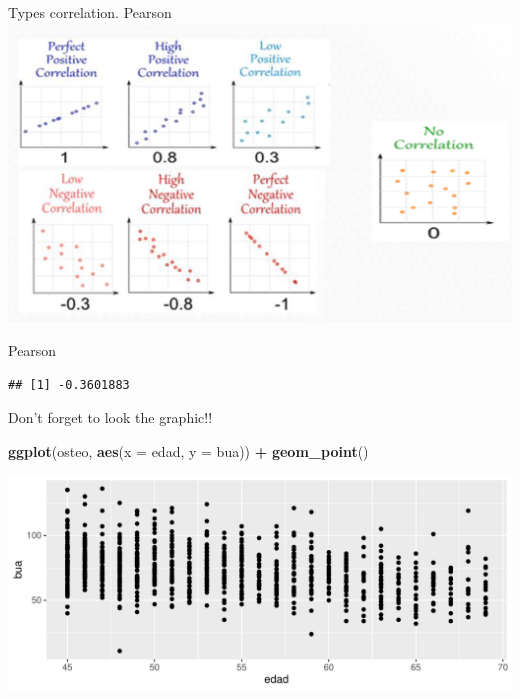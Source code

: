\documentclass[
  ignorenonframetext,
]{beamer}
\newenvironment{Shaded}{\begin{snugshade}}{\end{snugshade}}
\newcommand{\AttributeTok}[1]{\textcolor[rgb]{0.13,0.29,0.53}{#1}}
\newcommand{\FunctionTok}[1]{\textcolor[rgb]{0.13,0.29,0.53}{\textbf{#1}}}
\newcommand{\NormalTok}[1]{#1}
\newcommand{\SpecialCharTok}[1]{\textcolor[rgb]{0.81,0.36,0.00}{\textbf{#1}}}
\newcommand{\StringTok}[1]{\textcolor[rgb]{0.31,0.60,0.02}{#1}}
\begin{document}
\begin{frame}{Types correlation. Pearson}
\label{types-correlation.-pearson}
\includegraphics{images/types_correlation.png}
\end{frame}

\begin{frame}[fragile]{Pearson}
\label{pearson}
\begin{Shaded}
\end{Shaded}

\begin{verbatim}
## [1] -0.3601883
\end{verbatim}

Don't forget to look the graphic!!

\begin{Shaded}
\begin{Highlighting}[]
\FunctionTok{ggplot}\NormalTok{(osteo, }\FunctionTok{aes}\NormalTok{(}\AttributeTok{x =}\NormalTok{ edad, }\AttributeTok{y =}\NormalTok{ bua)) }\SpecialCharTok{+} 
  \FunctionTok{geom\_point}\NormalTok{()}
\end{Highlighting}
\end{Shaded}

\includegraphics{StatisticsWithR-3-Exploratory_Analysis_II_And_Graphics_files/figure-beamer/unnamed-chunk-22-1.pdf}
\end{frame}
\end{document}
